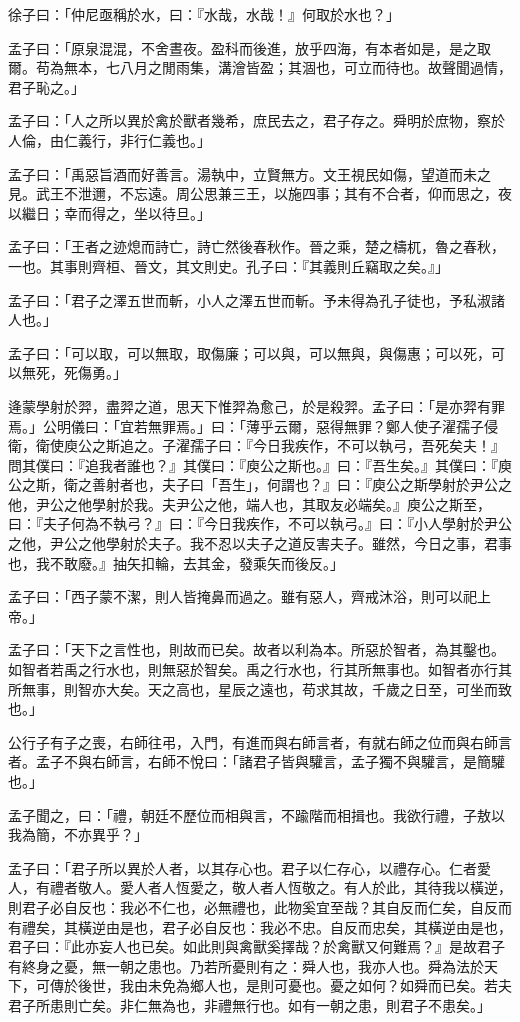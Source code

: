 \documentclass[12pt,a4paper]{ctexbook}
\begin{document}
徐子曰：「仲尼亟稱於水，曰：『水哉，水哉！』何取於水也？」\par
孟子曰：「原泉混混，不舍晝夜。盈科而後進，放乎四海，有本者如是，是之取爾。苟為無本，七八月之閒雨集，溝澮皆盈；其涸也，可立而待也。故聲聞過情，君子恥之。」\par
孟子曰：「人之所以異於禽於獸者幾希，庶民去之，君子存之。舜明於庶物，察於人倫，由仁義行，非行仁義也。」\par
孟子曰：「禹惡旨酒而好善言。湯執中，立賢無方。文王視民如傷，望道而未之見。武王不泄邇，不忘遠。周公思兼三王，以施四事；其有不合者，仰而思之，夜以繼日；幸而得之，坐以待旦。」\par
孟子曰：「王者之迹熄而詩亡，詩亡然後春秋作。晉之乘，楚之檮杌，魯之春秋，一也。其事則齊桓、晉文，其文則史。孔子曰：『其義則丘竊取之矣。』」\par
孟子曰：「君子之澤五世而斬，小人之澤五世而斬。予未得為孔子徒也，予私淑諸人也。」\par
孟子曰：「可以取，可以無取，取傷廉；可以與，可以無與，與傷惠；可以死，可以無死，死傷勇。」\par
逄蒙學射於羿，盡羿之道，思天下惟羿為愈己，於是殺羿。孟子曰：「是亦羿有罪焉。」公明儀曰：「宜若無罪焉。」曰：「薄乎云爾，惡得無罪？鄭人使子濯孺子侵衛，衛使庾公之斯追之。子濯孺子曰：『今日我疾作，不可以執弓，吾死矣夫！』問其僕曰：『追我者誰也？』其僕曰：『庾公之斯也。』曰：『吾生矣。』其僕曰：『庾公之斯，衛之善射者也，夫子曰「吾生」，何謂也？』曰：『庾公之斯學射於尹公之他，尹公之他學射於我。夫尹公之他，端人也，其取友必端矣。』庾公之斯至，曰：『夫子何為不執弓？』曰：『今日我疾作，不可以執弓。』曰：『小人學射於尹公之他，尹公之他學射於夫子。我不忍以夫子之道反害夫子。雖然，今日之事，君事也，我不敢廢。』抽矢扣輪，去其金，發乘矢而後反。」\par
孟子曰：「西子蒙不潔，則人皆掩鼻而過之。雖有惡人，齊戒沐浴，則可以祀上帝。」\par
孟子曰：「天下之言性也，則故而已矣。故者以利為本。所惡於智者，為其鑿也。如智者若禹之行水也，則無惡於智矣。禹之行水也，行其所無事也。如智者亦行其所無事，則智亦大矣。天之高也，星辰之遠也，苟求其故，千歲之日至，可坐而致也。」\par
公行子有子之喪，右師往弔，入門，有進而與右師言者，有就右師之位而與右師言者。孟子不與右師言，右師不悅曰：「諸君子皆與驩言，孟子獨不與驩言，是簡驩也。」\par
孟子聞之，曰：「禮，朝廷不歷位而相與言，不踰階而相揖也。我欲行禮，子敖以我為簡，不亦異乎？」\par
孟子曰：「君子所以異於人者，以其存心也。君子以仁存心，以禮存心。仁者愛人，有禮者敬人。愛人者人恆愛之，敬人者人恆敬之。有人於此，其待我以橫逆，則君子必自反也：我必不仁也，必無禮也，此物奚宜至哉？其自反而仁矣，自反而有禮矣，其橫逆由是也，君子必自反也：我必不忠。自反而忠矣，其橫逆由是也，君子曰：『此亦妄人也已矣。如此則與禽獸奚擇哉？於禽獸又何難焉？』是故君子有終身之憂，無一朝之患也。乃若所憂則有之：舜人也，我亦人也。舜為法於天下，可傳於後世，我由未免為鄉人也，是則可憂也。憂之如何？如舜而已矣。若夫君子所患則亡矣。非仁無為也，非禮無行也。如有一朝之患，則君子不患矣。」\par
\end{document}
